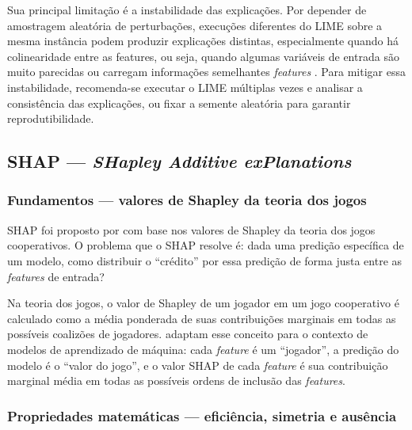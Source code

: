 \documentclass[
    12pt,                %
    openright,           %
    oneside,             %
    a4paper,             %
    english,             %
    brazil               %
]{abntex2}
\begin{document}
Sua principal limitação é a instabilidade das explicações. Por depender de amostragem aleatória de perturbações, execuções diferentes do LIME sobre a mesma instância podem produzir explicações distintas, especialmente quando há colinearidade entre as features, ou seja, quando algumas variáveis de entrada são muito parecidas ou carregam informações semelhantes \textit{features} \cite{salih2023}. Para mitigar essa instabilidade, recomenda-se executar o LIME múltiplas vezes e analisar a consistência das explicações, ou fixar a semente aleatória para garantir reprodutibilidade.


\subsection{SHAP — \textit{SHapley Additive exPlanations}}
\label{subsec:shap}

\subsubsection{Fundamentos — valores de Shapley da teoria dos jogos}
\label{subsubsec:shap_fundamentos}

SHAP foi proposto por  com base nos valores de Shapley da teoria dos jogos cooperativos. O problema que o SHAP resolve é: dada uma predição específica de um modelo, como distribuir o ``crédito'' por essa predição de forma justa entre as \textit{features} de entrada?

Na teoria dos jogos, o valor de Shapley de um jogador em um jogo cooperativo é calculado como a média ponderada de suas contribuições marginais em todas as possíveis coalizões de jogadores.  adaptam esse conceito para o contexto de modelos de aprendizado de máquina: cada \textit{feature} é um ``jogador'', a predição do modelo é o ``valor do jogo'', e o valor SHAP de cada \textit{feature} é sua contribuição marginal média em todas as possíveis ordens de inclusão das \textit{features}.

\subsubsection{Propriedades matemáticas — eficiência, simetria e ausência}
\label{subsubsec:shap_propriedades}
\end{document}
